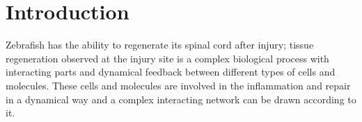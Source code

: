 \chapter{Introduction}







Zebrafish has the ability to regenerate its spinal cord after injury; tissue regeneration observed at the injury site is a complex biological process with interacting parts and dynamical feedback between different types of cells and molecules. These cells and molecules are involved in the inflammation and repair in a dynamical way and a complex interacting network can be drawn according to it.






